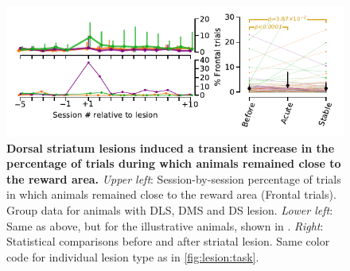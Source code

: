 \begin{figure}[h!]
	\begin{center}
		\includegraphics[scale=1]{ch-appendicies/figures/FrontalTrials.pdf}
		\caption[Frontal Trials After Striatal Lesion]
		{\textbf{Dorsal striatum lesions induced a transient increase in the percentage of trials during which animals remained close to the reward area.}
		\textit{Upper left}: Session-by-session percentage of trials in which animals remained close to the reward area (Frontal trials).
		Group data for animals with DLS, DMS and DS lesion.
		\textit{Lower left}: Same as above, but for the illustrative animals, shown in .
		\textit{Right}: Statistical comparisons before and after striatal lesion.
		Same color code for individual lesion type as in \autoref{fig:lesion:task}.
		}
		\label{fig:appendix:Frontal}
	\end{center}
\end{figure}
